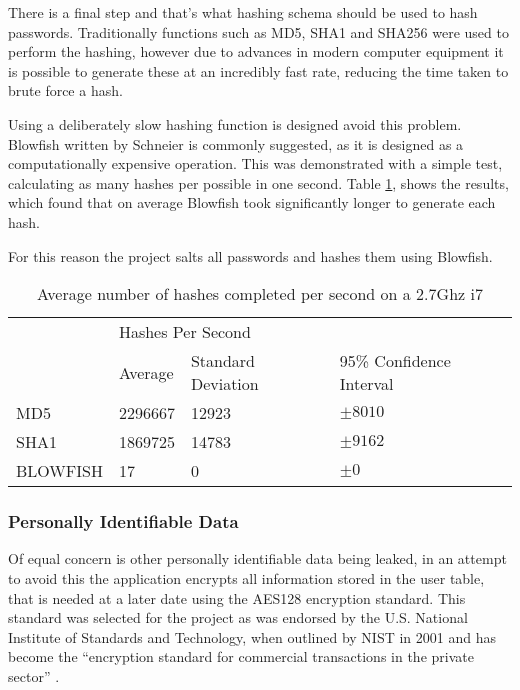 There is a final step and that's what hashing schema should be used to hash passwords. Traditionally functions such as MD5, SHA1 and SHA256 were used to perform the hashing, however due to advances in modern computer equipment it is possible to generate these at an incredibly fast rate, reducing the time taken to brute force a hash.

Using a deliberately slow hashing function is designed avoid this problem. Blowfish written by Schneier is commonly suggested, as it is designed as a computationally expensive operation. This was demonstrated with a simple test, calculating as many hashes per possible in one second. Table \ref{tab:hashspeed}, shows the results, which found that on average Blowfish took significantly longer to generate each hash.

For this reason the project salts all passwords and hashes them using Blowfish.

\begin{table}[h]
\begin{tabular}{llll}
         & \multicolumn{3}{l}{Hashes Per Second}                   \\
         & Average & Standard Deviation & 95\% Confidence Interval \\
MD5      & \num{2296667} & \num{12923}              & $\pm 8010$                 \\
SHA1     & \num{1869725} & \num{14783}             & $\pm 9162$                 \\
BLOWFISH & 17      & 0                   & $\pm 0$                    \\
\end{tabular}
\label{tab:hashspeed}
\caption{Average number of hashes completed per second on a 2.7Ghz i7 }
\end{table}

\subsubsection{Personally Identifiable Data}
Of equal concern is other personally identifiable data being leaked, in an attempt to avoid this the application encrypts all information stored in the user table, that is needed at a later date using the AES128 encryption standard. This standard was selected for the project as was endorsed by the U.S. National Institute of Standards and Technology, when outlined by NIST in 2001 and has become the ``encryption standard for commercial transactions in the private sector'' \cite{nist2010aes, stair2009informationsystems}.

